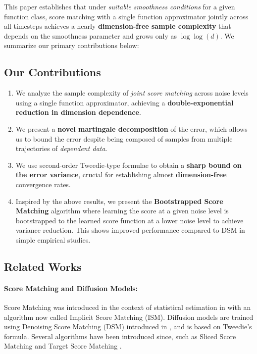 This paper establishes that under \textit{suitable smoothness conditions} for a given function class, score matching with a single function approximator jointly across all timesteps achieves a nearly \textbf{dimension-free sample complexity} that depends on the smoothness parameter and grows only as $\log\log(d)$.
We summarize our primary contributions below:
 \subsection{Our Contributions}
\begin{enumerate}
    \item We analyze the sample complexity of \textit{joint score matching} across noise levels using a single function approximator, achieving a \textbf{double-exponential reduction in dimension dependence}.
    \item We present a \textbf{novel martingale decomposition} of the error, which allows us to bound the error despite being composed of samples from multiple trajectories of \textit{dependent data}.
    \item We use second-order Tweedie-type formulae to obtain a \textbf{sharp bound on the error variance}, crucial for establishing almost \textbf{dimension-free} convergence rates.
    \item Inspired by the above results, we present the \textbf{Bootstrapped Score Matching} algorithm where learning the score at a given noise level is bootstrapped to the learned score function at a lower noise level to achieve variance reduction. This shows improved performance compared to DSM in simple empirical studies.
    \end{enumerate}

\subsection{Related Works}\label{subsec:related_works}
\paragraph{Score Matching and Diffusion Models:} Score Matching was introduced in the context of statistical estimation in \cite{hyvarinen2005estimation} with an algorithm now called Implicit Score Matching (ISM). Diffusion models are trained using Denoising Score Matching (DSM) introduced in \cite{vincent2011connection}, and is based on Tweedie's formula. Several algorithms have been introduced since, such as Sliced Score Matching \cite{song2020sliced} and Target Score Matching \cite{de2024target}.

